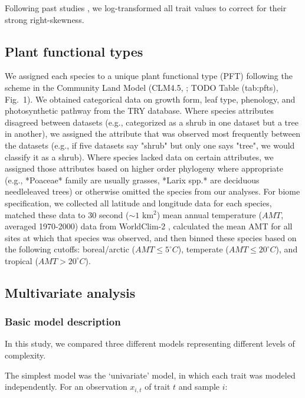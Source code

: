 Following past studies \cite{wright_worldwide_2004,wright_assessing_2005,onoda_2011_global,diaz_global_2016}, we log-transformed all trait values to correct for their strong right-skewness.

\subsection{Plant functional types}

We assigned each species to a unique plant functional type (PFT) following the scheme in the Community Land Model (CLM4.5, \cite{clm45_note}; TODO Table (tab:pfts), Fig.\ 1).
We obtained categorical data on growth form, leaf type, phenology, and photosynthetic pathway from the TRY database.
Where species attributes disagreed between datasets (e.g., categorized as a shrub in one dataset but a tree in another), we assigned the attribute that was observed most frequently between the datasets (e.g., if five datasets say "shrub" but only one says "tree", we would classify it as a shrub).
Where species lacked data on certain attributes, we assigned those attributes based on higher order phylogeny where appropriate (e.g., *Poaceae* family are usually grasses, *Larix spp.* are deciduous needleleaved trees) or otherwise omitted the species from our analyses.
For biome specification, we collected all latitude and longitude data for each species,
matched these data to 30 second ($\sim1$ km$^{2}$) mean annual temperature ($AMT$, averaged 1970-2000) data from WorldClim-2 \cite{worldclim},
calculated the mean AMT for all sites at which that species was observed,
and then binned these species based on the following cutoffs: boreal/arctic ($AMT \leq 5^\circ C$), temperate ($AMT \leq 20^\circ C$), and tropical ($AMT > 20^\circ C$).


\subsection{Multivariate analysis}

\subsubsection{Basic model description}

In this study, we compared three different models representing different levels of complexity.

The simplest model was the ‘univariate’ model, in which each trait was modeled independently.
For an observation $x_{i,t}$ of trait $t$ and sample $i$:

